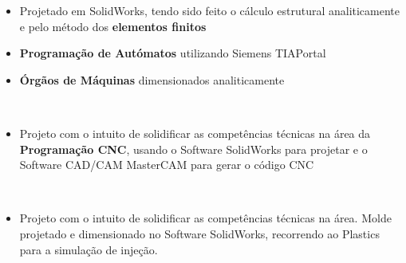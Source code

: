 \documentclass[10pt,a4paper]{altacv}
\begin{document}
\smallskip

     



\begin{itemize}
	\item Projetado em SolidWorks, tendo sido feito o cálculo estrutural analiticamente e pelo método dos \textbf{elementos finitos}
	\item \textbf{Programação de Autómatos} utilizando Siemens TIAPortal
	\item \textbf{Órgãos de Máquinas} dimensionados analiticamente
\end{itemize}

\smallskip

  \\

\divider


\begin{itemize}
	\item Projeto com o intuito de solidificar as competências técnicas na área da \textbf{Programação CNC}, usando o Software SolidWorks para projetar e o Software CAD/CAM MasterCAM para gerar o código CNC
	
\end{itemize}

\smallskip

  \\

\divider


\begin{itemize}
	\item Projeto com o intuito de solidificar as competências técnicas na área.
	Molde projetado e dimensionado no Software SolidWorks, recorrendo ao Plastics para a simulação de injeção.
\end{itemize}

\smallskip

 \\
\end{document}
